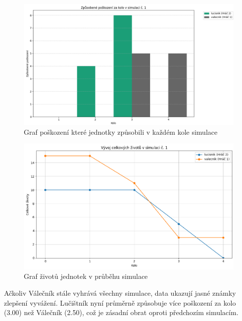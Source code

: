 \begin{figure}
  \centering      %
  \includegraphics[scale=0.5]{obr/graf_valVSluc_linie_damage2.png} %
  \caption{Graf poškození které jednotky způsobili v každém kole simulace} %
  \label{graf_valVSluc_linie_damage2} %
\end{figure}

\begin{figure}
  \centering      %
  \includegraphics[scale=0.5]{obr/graf_valVSluc_linie_HP2.png} %
  \caption{Graf životů jednotek v průběhu simulace} %
  \label{graf_valVSluc_linie_HP2} %
\end{figure}

Ačkoliv Válečník stále vyhrává všechny simulace, data ukazují jasné známky zlepšení vyvážení. Lučištník nyní průměrně způsobuje více poškození za kolo (3.00) než Válečník (2.50), což je zásadní obrat oproti předchozím simulacím.

